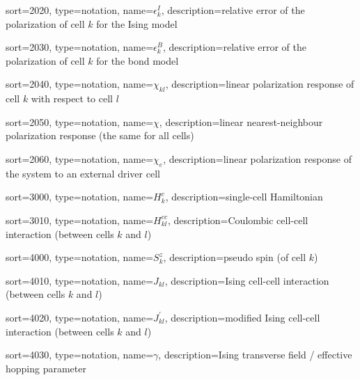 {
  sort=2020,
  type=notation,
  name={\ensuremath{\epsilon^I_k}},
  description={relative error of the polarization of cell $k$ for the Ising
  model}
}

{
  sort=2030,
  type=notation,
  name={\ensuremath{\epsilon^B_k}},
  description={relative error of the polarization of cell $k$ for the bond
  model}
}

{
  sort=2040,
  type=notation,
  name={\ensuremath{\chi_{kl}}},
  description={linear polarization response of cell $k$ with respect to cell $l$}
}

{
  sort=2050,
  type=notation,
  name={\ensuremath{\chi}},
  description={linear nearest-neighbour polarization response (the same for all
  cells)}
}

{
  sort=2060,
  type=notation,
  name={\ensuremath{\chi_e}},
  description={linear polarization response of the system to an external driver
  cell}
}

{
  sort=3000,
  type=notation,
  name={\ensuremath{H^c_k}},
  description={single-cell Hamiltonian}
}

{
  sort=3010,
  type=notation,
  name={\ensuremath{H^{cc}_{kl}}},
  description={Coulombic cell-cell interaction (between cells $k$ and $l$)}
}

{
  sort=4000,
  type=notation,
  name={\ensuremath{S^z_k}},
  description={pseudo spin (of cell $k$)}
}

{
  sort=4010,
  type=notation,
  name={\ensuremath{J_{kl}}},
  description={Ising cell-cell interaction (between cells $k$ and $l$)}
}

{
  sort=4020,
  type=notation,
  name={\ensuremath{J^{\prime}_{kl}}},
  description={modified Ising cell-cell interaction (between cells $k$ and $l$)}
}

{
  sort=4030,
  type=notation,
  name={\ensuremath{\gamma}},
  description={Ising transverse field / effective hopping parameter}
}

\glsaddall
